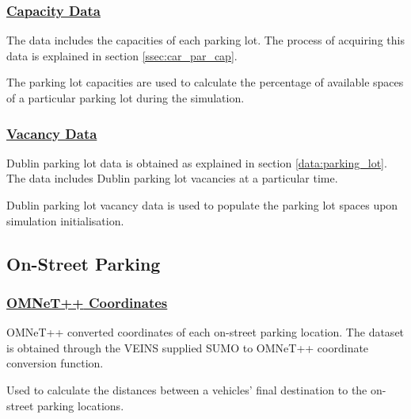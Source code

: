 \subsubsection{\underline{Capacity Data}}
\begin{description}[leftmargin=8em,style=nextline]
  \item[Explanation] The data includes the capacities of each parking lot. The process of acquiring this data is explained in section \ref{ssec:car_par_cap}.
  \item[Purpose] The parking lot capacities are used to calculate the percentage of available spaces of a particular parking lot during the simulation.
\end{description}

\subsubsection{\underline{Vacancy Data}}
\begin{description}[leftmargin=8em,style=nextline]
  \item[Explanation] Dublin parking lot data is obtained as explained in section \ref{data:parking_lot}. The data includes Dublin parking lot vacancies at a particular time.
  \item[Purpose] Dublin parking lot vacancy data is used to populate the parking lot spaces upon simulation initialisation.
\end{description}



\subsection{On-Street Parking}
\subsubsection{\underline{\ac{OMNeT++} Coordinates}}
\begin{description}[leftmargin=8em,style=nextline]
  \item[Explanation] \ac{OMNeT++} converted coordinates of each on-street parking location. The dataset is obtained through the \ac{VEINS} supplied \ac{SUMO} to \ac{OMNeT++} coordinate conversion function.
  \item[Purpose] Used to calculate the distances between a vehicles' final destination to the on-street parking locations.
\end{description}

